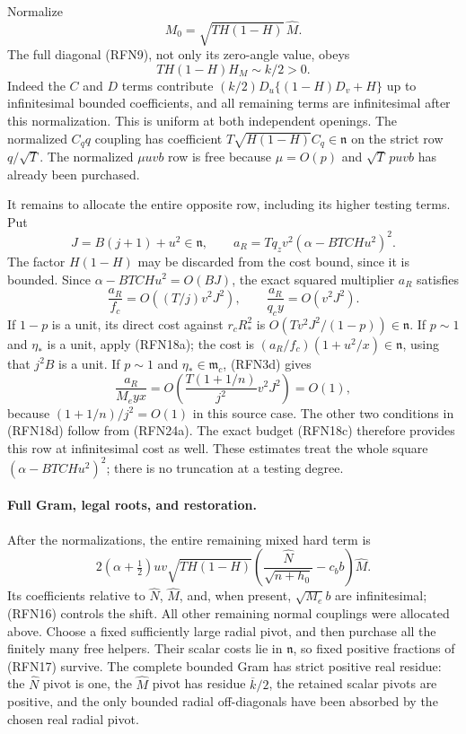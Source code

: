 Normalize
\[
 M_0=\sqrt{TH(1-H)}\,\widehat M.
\]
The full diagonal (RFN9), not only its zero-angle value, obeys
\[
 TH(1-H)H_M\sim k/2>0.                                 \tag{RFN23}
\]
Indeed the $C$ and $D$ terms contribute
$(k/2)D_u\{(1-H)D_v+H\}$ up to infinitesimal bounded coefficients,
and all remaining terms are infinitesimal after this normalization.
This is uniform at both independent openings.
The normalized $C_qq$ coupling has coefficient
$T\sqrt{H(1-H)}C_q\in\mathfrak n$ on the strict row $q/\sqrt T$.
The normalized $\mu uvb$ row is free because $\mu=O(p)$ and
$\sqrt T\,puvb$ has already been purchased.

It remains to allocate the entire opposite row, including its
higher testing terms.  Put
\[
 J=B(j+1)+u^2\in\mathfrak n,\qquad
 a_R=Tq_zv^2(\alpha-BTCHu^2)^2.
\]
The factor $H(1-H)$ may be discarded from the cost bound, since it is
bounded.  Since $\alpha-BTCHu^2=O(BJ)$, the exact squared multiplier
$a_R$ satisfies
\[
 \frac{a_R}{f_c}=O((T/j)v^2J^2),\qquad
 \frac{a_R}{q_cy}=O(v^2J^2).                            \tag{RFN24a}
\]
If $1-p$ is a unit, its direct cost against $r_cR_*^2$ is
$O(Tv^2J^2/(1-p))\in\mathfrak n$.
If $p\sim1$ and $\eta_*$ is a unit, apply (RFN18a); the cost is
$(a_R/f_c)(1+u^2/x)\in\mathfrak n$, using that $j^2B$ is a unit.
If $p\sim1$ and $\eta_*\in\mathfrak m_c$, (RFN3d) gives
\[
 \frac{a_R}{M_e yx}
     =O\!\left(\frac{T(1+1/n)}{j^2}v^2J^2\right)=O(1),  \tag{RFN24b}
\]
because $(1+1/n)/j^2=O(1)$ in this source case.  The other two
conditions in (RFN18d) follow from (RFN24a).  The exact budget
(RFN18c) therefore provides this row at infinitesimal cost as well.
These estimates treat the whole square
$(\alpha-BTCHu^2)^2$; there is no truncation at a testing degree.

\paragraph{Full Gram, legal roots, and restoration.}
After the normalizations, the entire remaining mixed hard term is
\[
 2(\alpha+\tfrac12)uv\sqrt{TH(1-H)}
    \left(\frac{\widehat N}{\sqrt{n+h_0}}-c_bb\right)\widehat M.
\]
Its coefficients relative to $\widehat N$, $\widehat M$, and, when
present, $\sqrt{M_e}b$ are infinitesimal; (RFN16) controls the shift.
All other remaining normal couplings were allocated above.  Choose a
fixed sufficiently large radial pivot, and then purchase all the
finitely many free helpers.  Their scalar costs lie in $\mathfrak n$,
so fixed positive fractions of (RFN17) survive.  The complete bounded
Gram has strict positive real residue: the $\widehat N$ pivot is one,
the $\widehat M$ pivot has residue $\overline{k}/2$, the retained scalar pivots
are positive, and the only bounded radial off-diagonals have been
absorbed by the chosen real radial pivot.

